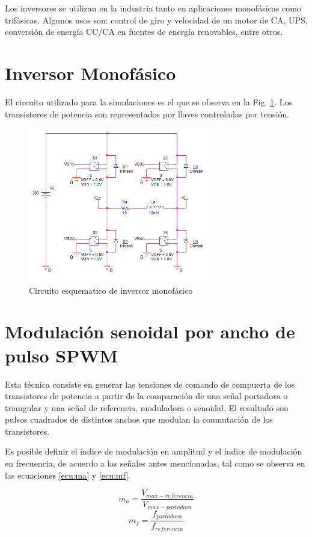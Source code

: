 \documentclass[conference]{IEEEtran}
\begin{document}
Los inversores se utilizan en la industria tanto en aplicaciones monofásicas como trifásicas. Algunos usos son: control de giro y velocidad de un motor de CA, UPS, conversión de energía CC/CA en fuentes de energía renovables, entre otros. 	

\section{Inversor Monofásico}
El circuito utilizado para la simulaciones es el que se observa en la Fig. \ref{fig:circuito}. Los transistores de potencia son representados por llaves controladas por tensión. 
\begin{figure}[t]
	\centering
	\includegraphics[width=8cm]{imagenes/circuito}
	\caption{Circuito esquematico de inversor monofásico}
	\label{fig:circuito}
\end{figure}

\section{Modulación senoidal por ancho de pulso SPWM}
Esta técnica consiste en generar las tensiones de comando de compuerta de los transistores de potencia a partir de la comparación de una señal portadora o triangular y una señal de referencia, moduladora o senoidal. El resultado son pulsos cuadrados de distintos anchos que modulan la conmutación de los transistores.

Es posible definir el índice de modulación en amplitud y el índice de modulación en frecuencia, de acuerdo a las señales antes mencionadas, tal como se observa en las ecuaciones \ref{ecu:ma} y \ref{ecu:mf}.

\begin{equation}
	m_a = \frac{V_{max - referencia}}{V_{max - portadora}}
	\label{ecu:ma}
\end{equation}
\begin{equation}
	m_f = \frac{f_{portadora}}{f_{referencia}}
	\label{ecu:mf}
\end{equation}
\end{document}
